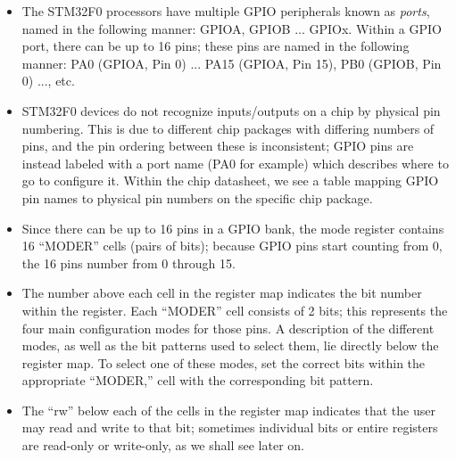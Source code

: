 \documentclass[11pt,fleqn]{book} %
\begin{document}
\begin{itemize}
    \item The STM32F0 processors have multiple GPIO peripherals known as \textit{ports}, named in the following manner: GPIOA, GPIOB ... GPIOx. Within a GPIO port, there can be up to 16 pins; these pins are named in the following manner: PA0 (GPIOA, Pin 0) ... PA15 (GPIOA, Pin 15), PB0 (GPIOB, Pin 0) ..., etc.
    \item STM32F0 devices do not recognize inputs/outputs on a chip by physical pin numbering. This is due to different chip packages with differing numbers of pins, and the pin ordering between these is inconsistent; GPIO pins are instead labeled with a port name (PA0 for example) which describes where to go to configure it. Within the chip datasheet, we see a table mapping GPIO pin names to physical pin numbers on the specific chip package.
    \item Since there can be up to 16 pins in a GPIO bank, the mode register contains 16 ``MODER'' cells (pairs of bits); because GPIO pins start counting from 0, the 16 pins number from 0 through 15.
    \item The number above each cell in the register map indicates the bit number within the register. Each ``MODER'' cell consists of 2 bits; this represents the four main configuration modes for those pins. A description of the different modes, as well as the bit patterns used to select them, lie directly below the register map.
    To select one of these modes, set the correct bits within the appropriate ``MODER,'' cell with the corresponding bit pattern.
    \item The ``rw'' below each of the cells in the register map indicates that the user may read and write to that bit; sometimes individual bits or entire registers are read-only or write-only, as we shall see later on.
\end{itemize}
\end{document}
